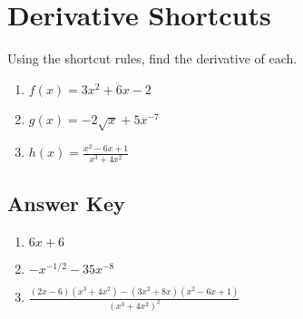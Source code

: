 \chapter{Derivative Shortcuts}

Using the shortcut rules, find the derivative of each.

\begin{enumerate}
	\item $f(x) = 3x^2 + 6x - 2$
	\item $g(x) = -2\sqrt{x} + 5x^{-7}$
	\item $h(x) = \frac{x^2-6x+1}{x^3+4x^2}$
\end{enumerate}

\newpage

\section{Answer Key}

\begin{enumerate}
	\item $6x+6$
    \item $-x^{-1/2}-35x^{-8}$
    \item $\frac{(2x-6)(x^3+4x^2)-(3x^2+8x)(x^2-6x+1)}{(x^3+4x^2)^2}$
\end{enumerate}